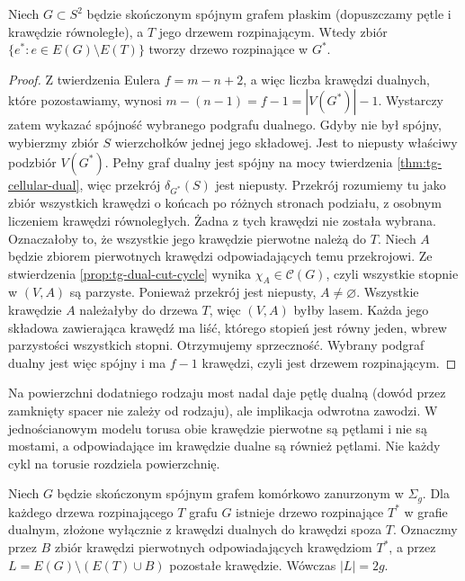 \begin{twierdzenie}
\label{thm:tg-dual-spanning}
Niech $G\subset S^2$ będzie skończonym spójnym grafem
płaskim (dopuszczamy pętle i krawędzie równoległe),
a $T$ jego drzewem rozpinającym. Wtedy zbiór
$\{e^*:e\in E(G)\setminus E(T)\}$ tworzy drzewo
rozpinające w $G^*$.
\end{twierdzenie}

\begin{proof}
Z twierdzenia Eulera $f=m-n+2$, a więc liczba krawędzi
dualnych, które pozostawiamy, wynosi
$m-(n-1)=f-1=|V(G^*)|-1$.
Wystarczy zatem wykazać spójność wybranego podgrafu dualnego.
Gdyby nie był spójny, wybierzmy zbiór $S$ wierzchołków
jednej jego składowej. Jest to niepusty właściwy podzbiór
$V(G^*)$. Pełny graf dualny jest spójny na mocy
twierdzenia \ref{thm:tg-cellular-dual}, więc przekrój
$\delta_{G^*}(S)$ jest niepusty. Przekrój rozumiemy
tu jako zbiór wszystkich krawędzi o końcach po różnych
stronach podziału, z osobnym liczeniem krawędzi
równoległych. Żadna z tych krawędzi nie została wybrana. Oznaczałoby to, że wszystkie jego krawędzie
pierwotne należą do $T$. Niech $A$ będzie zbiorem pierwotnych krawędzi odpowiadających
temu przekrojowi. Ze stwierdzenia \ref{prop:tg-dual-cut-cycle}
wynika $\chi_A\in\mathcal C(G)$, czyli wszystkie stopnie
w $(V,A)$ są parzyste. Ponieważ przekrój jest
niepusty, $A\ne\varnothing$. Wszystkie krawędzie $A$
należałyby do drzewa $T$, więc $(V,A)$ byłby lasem.
Każda jego składowa zawierająca krawędź ma liść,
którego stopień jest równy jeden, wbrew parzystości
wszystkich stopni. Otrzymujemy sprzeczność.
Wybrany podgraf dualny jest więc spójny i ma $f-1$
krawędzi, czyli jest drzewem rozpinającym.
\end{proof}

\begin{uwaga}
Na powierzchni dodatniego rodzaju most nadal daje
pętlę dualną (dowód przez zamknięty spacer nie zależy
od rodzaju), ale implikacja odwrotna zawodzi.
W jednościanowym modelu torusa obie krawędzie
pierwotne są pętlami i nie są mostami, a odpowiadające im krawędzie dualne
są również pętlami. Nie każdy cykl na torusie
rozdziela powierzchnię.
\end{uwaga}

\begin{twierdzenie}
\label{thm:tg-tree-cotree}
Niech $G$ będzie skończonym spójnym grafem komórkowo
zanurzonym w $\Sigma_g$. Dla każdego drzewa
rozpinającego $T$ grafu $G$ istnieje drzewo
rozpinające $T^*$ w grafie dualnym, złożone
wyłącznie z krawędzi dualnych do krawędzi spoza $T$.
Oznaczmy przez $B$ zbiór krawędzi pierwotnych
odpowiadających krawędziom $T^*$, a przez
$L=E(G)\setminus(E(T)\cup B)$ pozostałe krawędzie.
Wówczas $|L|=2g$.
\end{twierdzenie}

